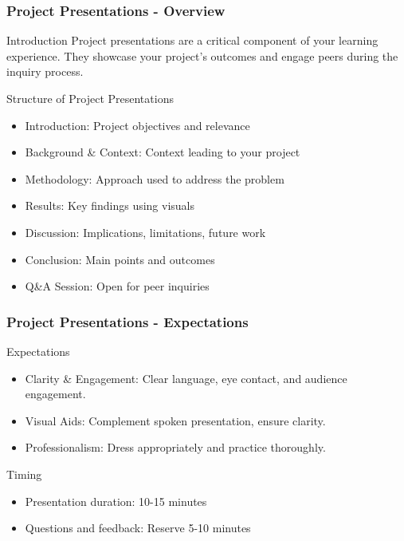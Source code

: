 \documentclass[aspectratio=169]{beamer}
\begin{document}
\begin{frame}[fragile]
    \frametitle{Project Presentations - Overview}
    \begin{block}{Introduction}
        Project presentations are a critical component of your learning experience. They showcase your project's outcomes and engage peers during the inquiry process.
    \end{block}
    \begin{block}{Structure of Project Presentations}
        \begin{itemize}
            \item Introduction: Project objectives and relevance
            \item Background & Context: Context leading to your project
            \item Methodology: Approach used to address the problem
            \item Results: Key findings using visuals
            \item Discussion: Implications, limitations, future work
            \item Conclusion: Main points and outcomes
            \item Q\&A Session: Open for peer inquiries
        \end{itemize}
    \end{block}
\end{frame}

\begin{frame}[fragile]
    \frametitle{Project Presentations - Expectations}
    \begin{block}{Expectations}
        \begin{itemize}
            \item Clarity \& Engagement: Clear language, eye contact, and audience engagement.
            \item Visual Aids: Complement spoken presentation, ensure clarity.
            \item Professionalism: Dress appropriately and practice thoroughly.
        \end{itemize}
    \end{block}
    \begin{block}{Timing}
        \begin{itemize}
            \item Presentation duration: 10-15 minutes
            \item Questions and feedback: Reserve 5-10 minutes
        \end{itemize}
    \end{block}
\end{frame}
\end{document}
